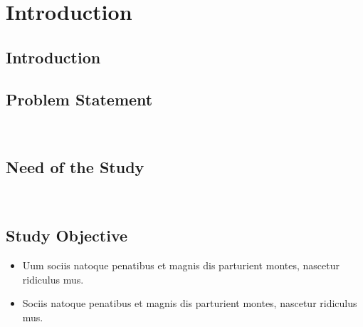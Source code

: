 
\chapter{Introduction}\doublespacing %

\label{Chapter1} %


\section{Introduction}

\lipsum[1]





\section{Problem Statement}

\lipsum[2]\\



 
\section{Need of the Study}

\lipsum[1-2]\\




\section{Study Objective}
\lipsum[1]

\begin{itemize}
    \item Uum sociis natoque penatibus et magnis dis
        parturient montes, nascetur ridiculus mus.
    \item Sociis natoque penatibus et magnis dis
        parturient montes, nascetur ridiculus mus.

\end{itemize}



